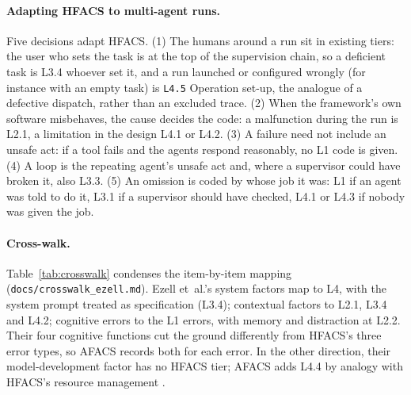 \documentclass[10pt]{article}
\newcommand{\code}[1]{\texttt{#1}}
\begin{document}
\paragraph{Adapting HFACS to multi-agent runs.}
\label{sec:people}
Five decisions adapt HFACS. (1) The humans around a run sit in existing tiers:
the user who sets the task is at the top of the supervision chain, so a deficient
task is L3.4 whoever set it, and a run launched or configured wrongly (for
instance with an empty task) is \code{L4.5} Operation set-up, the analogue of a
defective dispatch, rather than an excluded trace. (2) When the framework's own
software misbehaves, the cause decides the code: a malfunction during the run is
L2.1, a limitation in the design L4.1 or L4.2. (3) A failure need not include an
unsafe act: if a tool fails and the agents respond reasonably, no L1 code is
given. (4) A loop is the repeating agent's unsafe act and, where a supervisor
could have broken it, also L3.3. (5) An omission is coded by whose job it was: L1
if an agent was told to do it, L3.1 if a supervisor should have checked, L4.1 or
L4.3 if nobody was given the job.

\paragraph{Cross-walk.} Table~\ref{tab:crosswalk} condenses the item-by-item
mapping (\code{docs/crosswalk\_ezell.md}). Ezell et~al.'s system factors map to
L4, with the system prompt treated as specification (L3.4); contextual factors to
L2.1, L3.4 and L4.2; cognitive errors to the L1 errors, with memory and
distraction at L2.2. Their four cognitive functions cut the ground differently
from HFACS's three error types, so AFACS records both for each error. In the other
direction, their model-development factor has no HFACS tier; AFACS adds L4.4 by
analogy with HFACS's resource management \citep{wiegmann2001commercial}.
\end{document}
